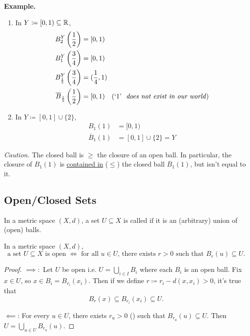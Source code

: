 \documentclass[14pt,oneside]{extarticle}
\newenvironment{example}{
    \par
    \vspace{5pt}
    \noindent\textbf{Example.}
    \begin{tcolorbox}[
        blanker, breakable, left=5mm, parbox=false,
        before upper={\parindent15pt},
        after skip=10pt,
        borderline west={1mm}{0pt}{solarized-magenta!50}]
}{
    \end{tcolorbox}
    \vspace{5pt}
}
\begin{document}
\begin{example}
    \begin{enumerate}[label=$\circ$, leftmargin=*, itemsep=1em]
      \item In $Y \coloneqq [0,1)\subseteq \mathbb{R}$, 
      \begin{align*}
        B_2^Y\left(\frac{1}{2}\right) & = [0,1) \\
        B_1^Y\left(\frac{3}{4}\right) & = [0,1) \\
        B_\frac{1}{2}^Y\left(\frac{3}{4}\right) & = (\frac{1}{4}, 1) \\
        \overline{B}_\frac{1}{2}\left(\frac{1}{2}\right) & = [0,1) \quad \text{(`$1$' \textit{ does not exist in our world})}
      \end{align*}  
      \item In $Y \coloneqq [0,1] \cup \{2\}$, 
      \begin{align*}
        B_1(1) & = [0,1) \\
        \overline{B}_1(1) & = [0,1] \cup \{2\} = Y
      \end{align*}
  \end{enumerate}
\end{example}

\textit{Caution.} The closed ball is $\geq$ the closure of an open ball. In particular, the closure of $B_1(1)$ is \underline{contained in} ($\leq$) the closed ball $\overline{B}_1(1)$, but isn't equal to it.

\subsection{Open/Closed Sets}
\begin{definition*}
  In a metric space $(X,d)$, a set $U \subseteq X$ is called  if it is an (arbitrary) union of (open) balls.
\end{definition*}

\begin{proposition*}
  In a metric space $(X,d)$, 
  \[\text{a set $U \subseteq X$ is open $\iff$ for all $u \in U$, there exists $r > 0$ such that $B_r(u) \subseteq U$.}\]
\end{proposition*}
\begin{proof}
  $\implies:$ Let $U$ be open i.e. $U = \bigcup_{i \in I} B_i$ where each $B_i$ is an open ball. Fix $x \in U$, so $x \in B_i = B_{r_i}(x_i)$. Then if we define $r \coloneqq r_i - d(x,x_i) > 0$, it's true that
  \[B_{r}(x) \subseteq B_{r_i}(x_i) \subseteq U.\]

  \pic

  $\impliedby$: For every $u \in U$, there exists $r_u >0 $ (\AC) such that $B_{r_u}(u) \subseteq U$. Then $U = \bigcup_{u \in U}B_{r_u}(u)$.
\end{proof}
\end{document}
